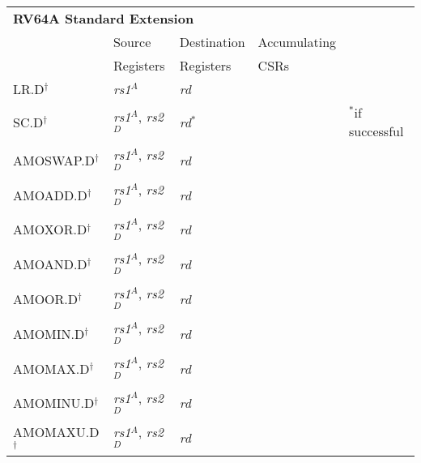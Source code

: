 \begin{tabular}{p{3cm}|p{3cm}|p{2cm}|p{4cm}|p{4cm}}
  \multicolumn{4}{l}{\bf RV64A Standard Extension} \\
  \cline{2-4}
   & Source    & Destination & Accumulating \\
   & Registers & Registers   & CSRs \\
  \cline{2-4}
   LR.D$^\dagger$ & {\em rs1}$^A$ & {\em rd} &   & \\
   \cline{2-4}
   SC.D$^\dagger$ & {\em rs1}$^A$, {\em rs2}$^D$ & {\em rd}$^*$ & & $^*$if successful  \\
   \cline{2-4}
   AMOSWAP.D$^\dagger$ & {\em rs1}$^A$, {\em rs2}$^D$ & {\em rd} &   & \\
   \cline{2-4}
   AMOADD.D$^\dagger$ & {\em rs1}$^A$, {\em rs2}$^D$ & {\em rd} &   & \\
   \cline{2-4}
   AMOXOR.D$^\dagger$ & {\em rs1}$^A$, {\em rs2}$^D$ & {\em rd} &   & \\
   \cline{2-4}
   AMOAND.D$^\dagger$ & {\em rs1}$^A$, {\em rs2}$^D$ & {\em rd} &   & \\
   \cline{2-4}
   AMOOR.D$^\dagger$ & {\em rs1}$^A$, {\em rs2}$^D$ & {\em rd} &   & \\
   \cline{2-4}
   AMOMIN.D$^\dagger$ & {\em rs1}$^A$, {\em rs2}$^D$ & {\em rd} &   & \\
   \cline{2-4}
   AMOMAX.D$^\dagger$ & {\em rs1}$^A$, {\em rs2}$^D$ & {\em rd} &   & \\
   \cline{2-4}
   AMOMINU.D$^\dagger$ & {\em rs1}$^A$, {\em rs2}$^D$ & {\em rd} &   & \\
   \cline{2-4}
   AMOMAXU.D$^\dagger$ & {\em rs1}$^A$, {\em rs2}$^D$ & {\em rd} &   & \\
   \cline{2-4}
\end{tabular}


